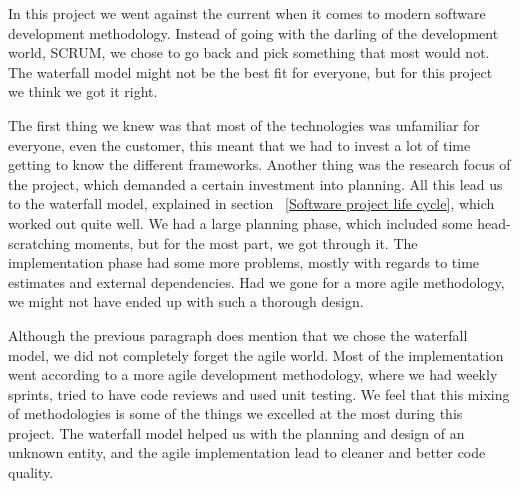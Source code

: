 In this project we went against the current when it comes to modern software development methodology. Instead of going with the darling of the development world, SCRUM, we chose to go back and pick something that most would not. The waterfall model might not be the best fit for everyone, but for this project we think we got it right.

The first thing we knew was that most of the technologies was unfamiliar for everyone, even the customer, this meant that we had to invest a lot of time getting to know the different frameworks. Another thing was the research focus of the project, which demanded a certain investment into planning. All this lead us to the waterfall model, explained in section ~\ref{Software project life cycle}, which worked out quite well. We had a large planning phase, which included some head-scratching moments, but for the most part, we got through it. The implementation phase had some more problems, mostly with regards to time estimates and external dependencies. Had we gone for a more agile methodology, we might not have ended up with such a thorough design.

Although the previous paragraph does mention that we chose the waterfall model, we did not completely forget the agile world. Most of the implementation went according to a more agile development methodology, where we had weekly sprints, tried to have code reviews and used unit testing. We feel that this mixing of methodologies is some of the things we excelled at the most during this project. The waterfall model helped us with the planning and design of an unknown entity, and the agile implementation lead to cleaner and better code quality.
